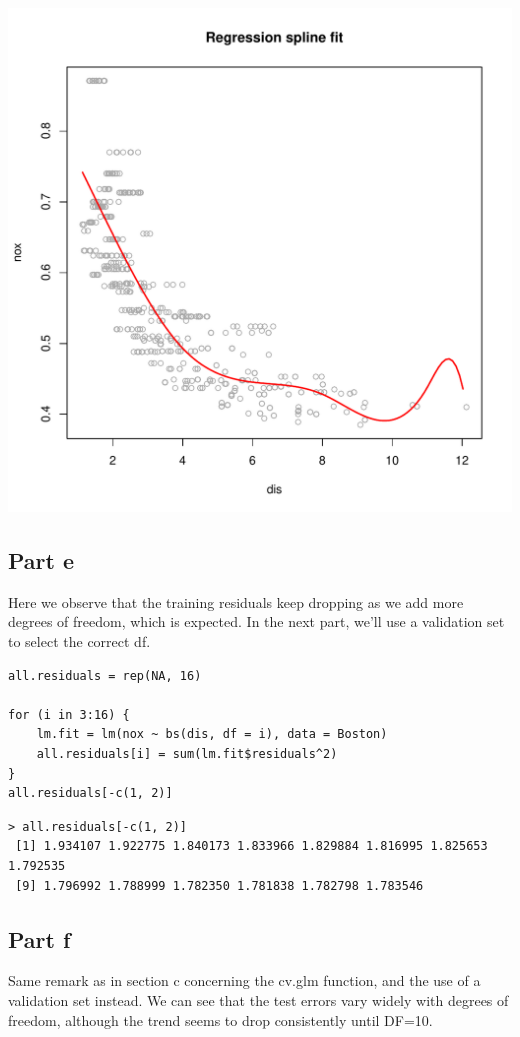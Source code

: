 \documentclass[11pt, a4paper]{article}
\begin{document}
\includegraphics[scale=0.6]{partd.pdf}
\subsection{Part e}
\label{sec-2-5}


Here we observe that the training residuals keep dropping as we add
more degrees of freedom, which is expected. In the next part, we'll
use a validation set to select the correct df.


\begin{verbatim}
all.residuals = rep(NA, 16)

for (i in 3:16) {
    lm.fit = lm(nox ~ bs(dis, df = i), data = Boston)
    all.residuals[i] = sum(lm.fit$residuals^2)
}
all.residuals[-c(1, 2)]
\end{verbatim}


\begin{verbatim}
> all.residuals[-c(1, 2)]
 [1] 1.934107 1.922775 1.840173 1.833966 1.829884 1.816995 1.825653 1.792535
 [9] 1.796992 1.788999 1.782350 1.781838 1.782798 1.783546
\end{verbatim}
\subsection{Part f}
\label{sec-2-6}


Same remark as in section c concerning the cv.glm function, and the
use of a validation set instead. We can see that the test errors vary
widely with degrees of freedom, although the trend seems to drop
consistently until DF=10.
\end{document}
